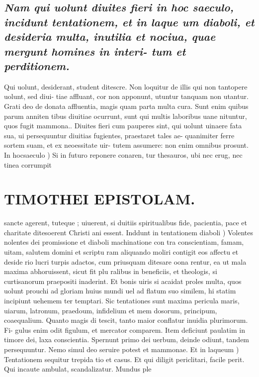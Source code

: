\documentclass{article}
\begin{document}
\begin{pages}
\subsection*{\textit{Nam qui uolunt diuites fieri in hoc saeculo, incidunt tentationem, et in laque um diaboli, et desideria multa, inutilia et nociua, quae mergunt homines in interi- tum et perditionem. }}\pstart Qui uolunt, desiderant, student ditescre. Non loquitur de illis qui non tantopere uolunt, sed diui- tiae affluant, cor non apponunt, utuntur tanquam non utantur. Grati deo de donata affluentia, magis quam parta multa cura. Sunt enim quibus parum anniten tibus diuitiae ocurrunt, sunt qui multis laboribus uane nituntur, quos fugit mammona.. Diuites fieri cum pauperes sint, qui uolunt uinaere fata sua, ui persequuntur diuitias fugientes, praestaret tales ae- quanimiter ferre sortem suam, et ex neoessitate uir- tutem assumere: non enim omnibus prosunt.  \pend\pstart In hocsaeculo ) Si in futuro reponere conaren, tur thesauros, ubi nec erug, nec tinea corrumpit  \pend
\section*{TIMOTHEI EPISTOLAM. }
\marginpar{[ p.165 ]}\pstart sancte agerent, tuteque ; uiuerent, si duitiis spiritualibus fide, pacientia, pace et charitate ditesoerent Christi ani essent.  \pend\pstart Inddunt in tentationem diaboli ) Volentes nolentes dei promissione et diaboli machinatione con tra conscientiam, famam, uitam, salutem domini et scriptu ram aliquando moliri contigit eos affectu et deside rio lucri turpis adactos, cum priusquam ditesare oona rentur, ea ut mala maxima abhoruissent, sicut fit plu ralibus in beneficiis, et theologis, si curtisanorum praepositi inaderint. Et bonis uiris si acaidat proles multa, quos uolunt prouchi ad gloriam huius mundi uel ad flatum suo similem, hi statim incipiunt uehemem ter temptari. Sic tentationes sunt maxima pericula maris, uiarum, latronum, praedoum, infidelium et mem dosorum, principum, coaequalium. Quanto magis di tescit, tanto maior conflatur inuidia plurimorum. Fi- gulus enim odit figulum, et mercator comparem. Item deficiunt paulatim in timore dei, laxa conscientia. Spernunt primo dei uerbum, deinde odiunt, tandem persequuntur. Nemo simul deo seruire potest et mammonae.  \pend\pstart Et in laqueum ) Tentationem sequitur trepida tio et casus. Et qui diligit periclitari, facile perit. Qui incaute ambulat, scandalizatur. Mundus ple  \pend

\end{pages}
\end{document}
